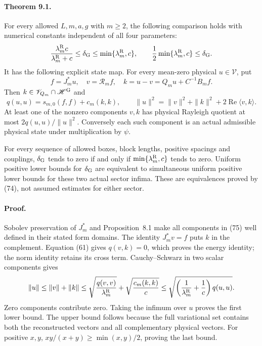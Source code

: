 \documentclass[11pt]{article}
\newcommand{\Rea}{\operatorname{Re}}
\newcommand{\HH}{\mathscr H}
\newcommand{\VV}{\mathscr V}
\begin{document}
\paragraph{Theorem 9.1.}
For every allowed $L,m,a,g$ with $m\geq2$, the following comparison
holds with numerical constants independent of all four parameters:
\begin{equation}\label{eq:harmonicgap}
 \frac{\lambda_m^{\rm R}c}{\lambda_m^{\rm R}+c}
 \leq\delta_{\rm G}\leq\min\{\lambda_m^{\rm R},c\},\qquad
 \frac12\min\{\lambda_m^{\rm R},c\}\leq\delta_{\rm G}.
\end{equation}
It has the following explicit state map. For every mean-zero physical
$u\in\VV$, put
\begin{equation}\label{eq:softdecomposition}
 f=J_m^*u,\quad v=\mathcal R_m f,\quad
 k=u-v=Q_mu+C^{-1}B_mf .
\end{equation}
Then $k\in\VV_{Q_m}\cap\HH^{\rm G}$ and
\begin{equation}\label{eq:softidentities}
 q(u,u)=s_{m,0}(f,f)+c_m(k,k),\qquad
 \|u\|^2=\|v\|^2+\|k\|^2+2\Rea\langle v,k\rangle .
\end{equation}
At least one of the nonzero components $v,k$ has physical Rayleigh
quotient at most $2q(u,u)/\|u\|^2$. Conversely each such component is an
actual admissible physical state under multiplication by $\psi$.

For every sequence of allowed boxes, block lengths, positive spacings
and couplings, $\delta_{\rm G}$ tends to zero if and only if
$\min\{\lambda_m^{\rm R},c\}$ tends to zero. Uniform positive lower
bounds for $\delta_{\rm G}$ are equivalent to simultaneous uniform
positive lower bounds for these two actual sector infima. These are
equivalences proved by (74), not assumed estimates
for either sector.

\paragraph{Proof.}
Sobolev preservation of $J_m^*$ and Proposition~8.1
make all components in (75) well defined in
their stated form domains. The identity $J_m^*v=f$ puts $k$ in the
complement. Equation (61) gives $q(v,k)=0$,
which proves the energy identity; the norm identity retains its
cross term. Cauchy--Schwarz in two scalar components gives
\[
 \|u\|\leq\|v\|+\|k\|
 \leq\sqrt{\frac{q(v,v)}{\lambda_m^{\rm R}}}
      +\sqrt{\frac{c_m(k,k)}c}
 \leq\sqrt{\left(\frac1{\lambda_m^{\rm R}}+\frac1c\right)q(u,u)}.
\]
Zero components contribute zero. Taking the infimum over $u$ proves
the first lower bound. The upper bound follows because the full
variational set contains both the reconstructed vectors and all
complementary physical vectors. For positive $x,y$,
$xy/(x+y)\geq\min(x,y)/2$, proving the last bound.
\end{document}
